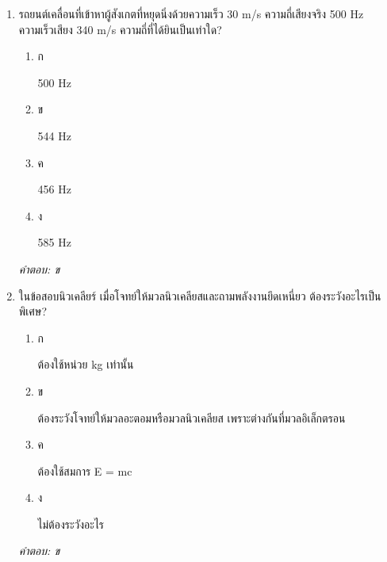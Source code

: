 \documentclass[12pt]{article}
\begin{document}
\begin{enumerate}[label=\arabic*., itemsep=0.5\baselineskip, topsep=0.5\baselineskip, leftmargin=*]
\item รถยนต์เคลื่อนที่เข้าหาผู้สังเกตที่หยุดนิ่งด้วยความเร็ว 30 m/s ความถี่เสียงจริง 500 Hz ความเร็วเสียง 340 m/s ความถี่ที่ได้ยินเป็นเท่าใด?
\begin{enumerate}[label=\alph*)., itemsep=0.3\baselineskip, topsep=0.3\baselineskip]
\item ก\ 
\begin{minipage}[t]{0.9\linewidth}
\raggedright 500 Hz
\end{minipage}
\item ข\ 
\begin{minipage}[t]{0.9\linewidth}
\raggedright 544 Hz
\end{minipage}
\item ค\ 
\begin{minipage}[t]{0.9\linewidth}
\raggedright 456 Hz
\end{minipage}
\item ง\ 
\begin{minipage}[t]{0.9\linewidth}
\raggedright 585 Hz
\end{minipage}
\end{enumerate}
\vspace{-0.3\baselineskip}
\begin{small}
\textit{คำตอบ: ข}
\end{small}

\item ในข้อสอบนิวเคลียร์ เมื่อโจทย์ให้มวลนิวเคลียสและถามพลังงานยึดเหนี่ยว ต้องระวังอะไรเป็นพิเศษ?
\begin{enumerate}[label=\alph*)., itemsep=0.3\baselineskip, topsep=0.3\baselineskip]
\item ก\ 
\begin{minipage}[t]{0.9\linewidth}
\raggedright ต้องใช้หน่วย kg เท่านั้น
\end{minipage}
\item ข\ 
\begin{minipage}[t]{0.9\linewidth}
\raggedright ต้องระวังโจทย์ให้มวลอะตอมหรือมวลนิวเคลียส เพราะต่างกันที่มวลอิเล็กตรอน
\end{minipage}
\item ค\ 
\begin{minipage}[t]{0.9\linewidth}
\raggedright ต้องใช้สมการ E = mc
\end{minipage}
\item ง\ 
\begin{minipage}[t]{0.9\linewidth}
\raggedright ไม่ต้องระวังอะไร
\end{minipage}
\end{enumerate}
\vspace{-0.3\baselineskip}
\begin{small}
\textit{คำตอบ: ข}
\end{small}


\end{enumerate}
\end{document}
